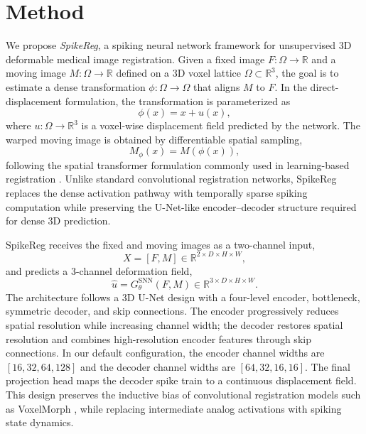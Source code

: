 \section{Method}
\label{sec:method}


We propose \emph{SpikeReg}, a spiking neural network framework for unsupervised 3D deformable medical image registration. Given a fixed image $F:\Omega \rightarrow \mathbb{R}$ and a moving image $M:\Omega \rightarrow \mathbb{R}$ defined on a 3D voxel lattice $\Omega \subset \mathbb{R}^{3}$, the goal is to estimate a dense transformation $\phi:\Omega \rightarrow \Omega$ that aligns $M$ to $F$. In the direct-displacement formulation, the transformation is parameterized as
\begin{equation}
    \phi(x) = x + u(x),
\end{equation}
where $u:\Omega \rightarrow \mathbb{R}^{3}$ is a voxel-wise displacement field predicted by the network. The warped moving image is obtained by differentiable spatial sampling,
\begin{equation}
    M_{\phi}(x) = M(\phi(x)),
\end{equation}
following the spatial transformer formulation commonly used in learning-based registration \citep{jaderberg2015spatial,balakrishnan2019voxelmorph,dalca2018diffeomorphic}. Unlike standard convolutional registration networks, SpikeReg replaces the dense activation pathway with temporally sparse spiking computation while preserving the U-Net-like encoder--decoder structure required for dense 3D prediction.


SpikeReg receives the fixed and moving images as a two-channel input,
\begin{equation}
    X = [F, M] \in \mathbb{R}^{2 \times D \times H \times W},
\end{equation}
and predicts a 3-channel deformation field,
\begin{equation}
    \hat{u} = G_{\theta}^{\mathrm{SNN}}(F,M) \in \mathbb{R}^{3 \times D \times H \times W}.
\end{equation}
The architecture follows a 3D U-Net design with a four-level encoder, bottleneck, symmetric decoder, and skip connections. The encoder progressively reduces spatial resolution while increasing channel width; the decoder restores spatial resolution and combines high-resolution encoder features through skip connections. In our default configuration, the encoder channel widths are $[16,32,64,128]$ and the decoder channel widths are $[64,32,16,16]$. The final projection head maps the decoder spike train to a continuous displacement field. This design preserves the inductive bias of convolutional registration models such as VoxelMorph \citep{balakrishnan2019voxelmorph}, while replacing intermediate analog activations with spiking state dynamics.

